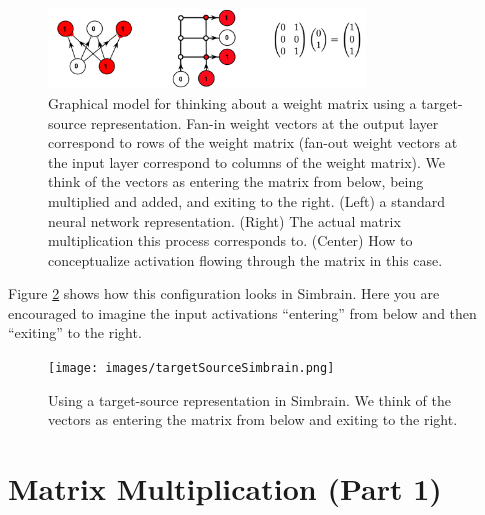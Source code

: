 

\begin{figure}[h]
\centering
\includegraphics[width=0.75\textwidth]{images/targetSource.png}
\caption[Jeff Yoshimi.]{Graphical model for thinking about a weight matrix using a target-source representation.  Fan-in weight vectors at the output layer correspond to rows of the weight matrix (fan-out weight vectors at the input layer correspond to columns of the weight matrix). We think of the vectors as entering the matrix from below, being multiplied and added, and exiting to the right. (Left) a standard neural network representation. (Right) The actual matrix multiplication this process corresponds to. (Center) How to conceptualize activation flowing through the matrix in this case. }
\label{targetSourceConvention}
\end{figure}

Figure \ref{targetSourceSimbrain} shows how this configuration looks in Simbrain. Here you are encouraged to imagine  the input activations  ``entering'' from below and then ``exiting'' to the right.

\begin{figure}[h]
\centering
\texttt{[image: images/targetSourceSimbrain.png]}
\caption[Jeff Yoshimi.]{Using a target-source representation in Simbrain. We think of the vectors as entering the matrix from below and exiting to the right.}
\label{targetSourceSimbrain}
\end{figure}

\section{Matrix Multiplication (Part 1)}\label{matrixProduct1}

